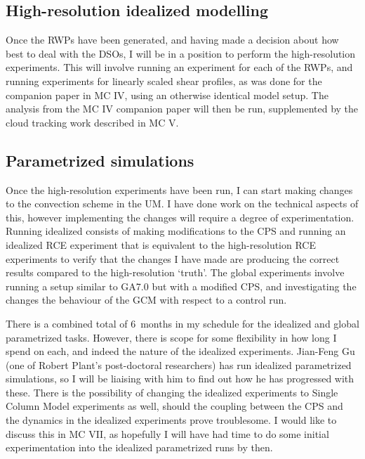 \documentclass[11pt,a4paper]{article}
\begin{document}
\subsection{High-resolution idealized modelling}
\label{sec:High-resolution idealized modelling}

Once the RWPs have been generated, and having made a decision about how best to deal with the DSOs, I will be in a position to perform the high-resolution experiments. This will involve running an experiment for each of the RWPs, and running experiments for linearly scaled shear profiles, as was done for the companion paper in MC IV, using an otherwise identical model setup. The analysis from the MC IV companion paper will then be run, supplemented by the cloud tracking work described in MC V.

\subsection{Parametrized simulations}
\label{sec:Parametrized simulations}

Once the high-resolution experiments have been run, I can start making changes to the convection scheme in the UM. I have done work on the technical aspects of this, however implementing the changes will require a degree of experimentation. Running idealized consists of making modifications to the CPS and running an idealized RCE experiment that is equivalent to the high-resolution RCE experiments to verify that the changes I have made are producing the correct results compared to the high-resolution `truth'. The global experiments involve running a setup similar to GA7.0 but with a modified CPS, and investigating the changes the behaviour of the GCM with respect to a control run.

There is a combined total of \SI{6}{months} in my schedule for the idealized and global parametrized tasks.  However, there is scope for some flexibility in how long I spend on each, and indeed the nature of the idealized experiments. Jian-Feng Gu (one of Robert Plant's post-doctoral researchers) has run idealized parametrized simulations, so I will be liaising with him to find out how he has progressed with these. There is the possibility of changing the idealized experiments to Single Column Model experiments as well, should the coupling between the CPS and the dynamics in the idealized experiments prove troublesome. I would like to discuss this in MC VII, as hopefully I will have had time to do some initial experimentation into the idealized parametrized runs by then.
\end{document}
